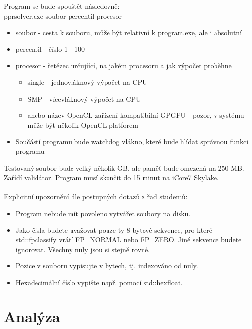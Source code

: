 \documentclass[12pt, a4paper]{article}
\begin{document}
\noindent Program se bude spouštět následovně: \\

\noindent pprsolver.exe soubor percentil procesor
\begin{itemize}
\item soubor - cesta k souboru, může být relativní k program.exe, ale i absolutní
\item percentil - číslo 1 - 100
\item procesor - řetězec určujíící, na jakém procesoru a jak výpočet proběhne
\begin{itemize}
\item single - jednovláknový výpočet na CPU
\item SMP - vícevláknový výpočet na CPU
\item anebo název OpenCL zařízení kompatibilní GPGPU - pozor, v systému může být několik OpenCL platforem
\end{itemize}
\item Součástí programu bude watchdog vlákno, které bude hlídat správnou funkci programu
\end{itemize}
Testovaný soubor bude velký několik GB, ale paměť bude omezená na 250 MB. Zařídí validátor. Program musí skončit do 15 minut na iCore7 Skylake. \\
\\
\noindent Explicitní upozornění dle postupných dotazů z řad studentů:
\begin{itemize}
\item Program nebude mít povoleno vytvářet soubory na disku.
\item Jako čísla budete uvažovat pouze ty 8-bytové sekvence, pro které std::fpclassify vrátí FP\_NORMAL nebo FP\_ZERO. Jiné sekvence budete ignorovat. Všechny nuly jsou si stejně rovné.
\item Pozice v souboru vypisujte v bytech, tj. indexováno od nuly.
\item Hexadecimální číslo vypište např. pomocí std::hexfloat.
\end{itemize}

\newpage







\section{Analýza}
\end{document}

